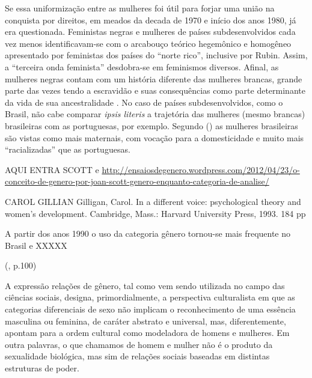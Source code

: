 Se essa uniformização entre as mulheres foi útil para forjar uma união na conquista por direitos, em meados da decada de 1970 e início dos anos 1980, já era questionada. Feministas negras e mulheres de países subdesenvolvidos \cite{FURTADO2009} cada vez menos identificavam-se com o arcabouço teórico hegemônico e homogêneo apresentado por feministas dos países do ``norte rico'', inclusive por Rubin. Assim, a ``terceira onda feminista'' desdobra-se em feminismos diversos. Afinal, as mulheres negras contam com um história diferente das mulheres brancas, grande parte das vezes tendo a escravidão e suas consequências como parte determinante da vida de sua ancestralidade \cite{HOOKS1990,CRENSHAW2002}. No caso de países subdesenvolvidos, como o Brasil, não cabe comparar \emph{ipsis literis} a trajetória das mulheres (mesmo brancas) brasileiras com as portuguesas, por exemplo. Segundo  (\citeyear{PINTO2004}) as mulheres brasileiras são vistas como mais maternais, com vocação para a domesticidade e muito mais ``racializadas'' que as portuguesas.


AQUI ENTRA SCOTT e 
\url{http://ensaiosdegenero.wordpress.com/2012/04/23/o-conceito-de-genero-por-joan-scott-genero-enquanto-categoria-de-analise/}

CAROL GILLIAN
Gilligan, Carol. In a different voice: psychological theory and women's development. Cambridge, Mass.: Harvard University Press, 1993. 184 pp

A partir dos anos 1990 o uso da categoria gênero tornou-se mais frequente no Brasil \cite{MORAES1998} e XXXXX

(\citeyear{MORAES1998}, p.100)
\begin{citacao}
A expressão relações de gênero, tal como vem sendo utilizada no campo das ciências sociais, designa, primordialmente, a perspectiva culturalista em que as categorias diferenciais de sexo não implicam o reconhecimento de uma essência masculina ou feminina, de caráter abstrato e universal, mas, diferentemente, apontam para a ordem cultural como modeladora de homens e mulheres. Em outra palavras, o que chamamos de homem e mulher não é o produto da sexualidade biológica, mas sim de relações sociais baseadas em distintas estruturas de poder.
\end{citacao}

